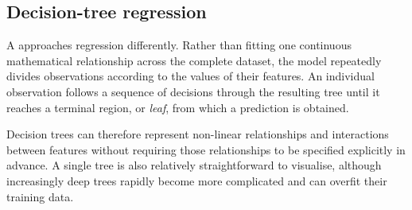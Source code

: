 \subsection{Decision-tree regression}

A  approaches regression differently.
Rather than fitting one continuous mathematical relationship across the complete dataset, the model repeatedly divides observations according to the values of their features.
An individual observation follows a sequence of decisions through the resulting tree until it reaches a terminal region, or \emph{leaf}, from which a prediction is obtained.

Decision trees can therefore represent non-linear relationships and interactions between features without requiring those relationships to be specified explicitly in advance.
A single tree is also relatively straightforward to visualise, although increasingly deep trees rapidly become more complicated and can overfit their training data.

